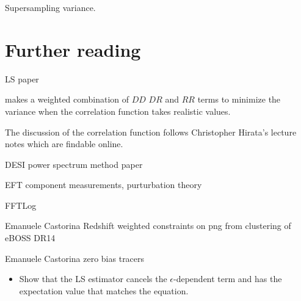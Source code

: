 Supersampling variance.

\section*{Further reading}

LS paper \citet{1993ApJ...412...64L}


\citet{1994ApJ...424..569B}


\citet{2013A&A...554A.131V} makes a weighted combination of $DD$ $DR$ and $RR$ terms to minimize the variance when the correlation function takes realistic values.


\citet{2019A&A...631A..73K}


The discussion of the correlation function follows Christopher Hirata's lecture notes which are findable online.

DESI power spectrum method paper


EFT component measurements, purturbation theory

FFTLog

Emanuele Castorina Redshift weighted constraints on png from clustering of eBOSS DR14

Emanuele Castorina zero bias tracers


\exercises

\begin{itemize}
  \item Show that the LS estimator cancels the $\epsilon$-dependent term and has the expectation value that matches the equation.
\end{itemize}

